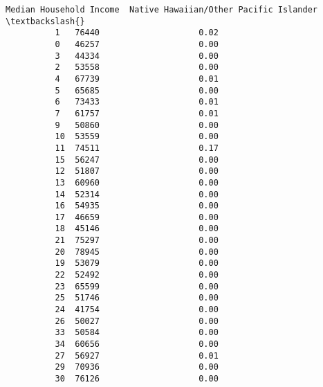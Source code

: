 \documentclass[11pt]{article}
\begin{document}
\begin{Verbatim}[commandchars=\\\{\}]
              Median Household Income  Native Hawaiian/Other Pacific Islander  \textbackslash{}
          1   76440                    0.02                                     
          0   46257                    0.00                                     
          3   44334                    0.00                                     
          2   53558                    0.00                                     
          4   67739                    0.01                                     
          5   65685                    0.00                                     
          6   73433                    0.01                                     
          7   61757                    0.01                                     
          9   50860                    0.00                                     
          10  53559                    0.00                                     
          11  74511                    0.17                                     
          15  56247                    0.00                                     
          12  51807                    0.00                                     
          13  60960                    0.00                                     
          14  52314                    0.00                                     
          16  54935                    0.00                                     
          17  46659                    0.00                                     
          18  45146                    0.00                                     
          21  75297                    0.00                                     
          20  78945                    0.00                                     
          19  53079                    0.00                                     
          22  52492                    0.00                                     
          23  65599                    0.00                                     
          25  51746                    0.00                                     
          24  41754                    0.00                                     
          26  50027                    0.00                                     
          33  50584                    0.00                                     
          34  60656                    0.00                                     
          27  56927                    0.01                                     
          29  70936                    0.00                                     
          30  76126                    0.00                                     

\end{Verbatim}
\end{document}
